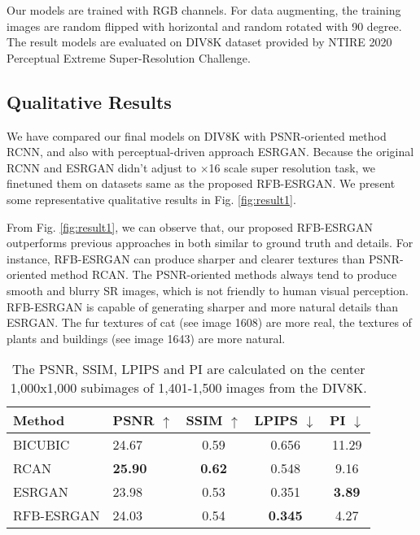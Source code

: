 \documentclass[10pt,twocolumn,letterpaper]{article}
\begin{document}
Our models are trained with RGB channels. For data augmenting, the training images are random flipped with horizontal and random rotated with 90 degree. The result models are evaluated on DIV8K dataset provided by NTIRE 2020 Perceptual Extreme Super-Resolution Challenge.



\subsection{Qualitative Results}
We have compared our final models on DIV8K with PSNR-oriented method RCNN, and also with perceptual-driven approach ESRGAN. Because the original RCNN and ESRGAN didn't adjust to $\times$16 scale super resolution task, we finetuned them on datasets same as the proposed RFB-ESRGAN. We present some representative qualitative results in Fig. \ref{fig:result1}. 

From Fig. \ref{fig:result1}, we can observe that, our proposed RFB-ESRGAN outperforms previous approaches in both similar to ground truth and details. For instance, RFB-ESRGAN can produce sharper and clearer textures than PSNR-oriented method RCAN. The PSNR-oriented methods always tend to produce smooth and blurry SR images, which is not friendly to human visual perception. RFB-ESRGAN is capable of generating sharper and more natural details than ESRGAN. The fur textures of cat (see image 1608) are more real, the textures of plants and buildings (see image 1643) are more natural.

\begin{table}[htbp]
\centering
\begin{tabular}{llccc}
\hline \hline
\multicolumn{1}{l|}{Method}          & PSNR $\uparrow$   & SSIM $\uparrow$    & LPIPS $\downarrow$  & PI $\downarrow$  \\ \hline
\multicolumn{1}{l|}{BICUBIC}      & 24.67  & 0.59  & 0.656  & 11.29 \\
\multicolumn{1}{l|}{RCAN}        & \textbf{25.90}  & \textbf{0.62}  & 0.548  & 9.16 \\
\multicolumn{1}{l|}{ESRGAN}   & 23.98  & 0.53  & 0.351  & \textbf{3.89} \\
\multicolumn{1}{l|}{RFB-ESRGAN}  & 24.03  & 0.54  & \textbf{0.345}  & 4.27  \\
\hline\hline
\end{tabular}
\caption{The PSNR, SSIM, LPIPS and PI are calculated on the center 1,000x1,000 subimages of 1,401-1,500 images from the DIV8K.}
\label{tab:validation1}
\end{table}
\end{document}
